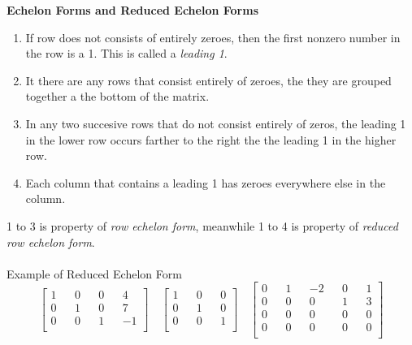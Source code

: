 \documentclass[a4paper, 12pt]{article}
\begin{document}
\textbf{Echelon Forms and Reduced Echelon Forms}
\begin{enumerate}
\item If row does not consists of entirely zeroes, then the first nonzero 
      number in the row is a 1. This is called a \textit{leading 1}.
\item It there are any rows that consist entirely of zeroes, the they are 
      grouped together a the bottom of the matrix.
\item In any two succesive rows that do not consist entirely of zeros, the 
      leading 1 in the lower row occurs farther to the right the the 
      leading 1 in the higher row.
\item Each column that contains a leading 1 has zeroes everywhere else in
      the column.
\end{enumerate}
1 to 3 is property of  \textit{row echelon form}, meanwhile 1 to 4 is 
property of \textit{reduced row echelon form}.
\\
\\
Example of Reduced Echelon Form
$$
\begin{bmatrix}
1 && 0 && 0 && 4 \\
0 && 1 && 0 && 7 \\
0 && 0 && 1 && -1 \\
\end{bmatrix}
\quad
\begin{bmatrix}
1 && 0 && 0 \\
0 && 1 && 0 \\
0 && 0 && 1 \\
\end{bmatrix}
\quad
\begin{bmatrix}
0 && 1 && -2 && 0 && 1 \\
0 && 0 && 0 && 1 && 3  \\
0 && 0 && 0 && 0 && 0  \\
0 && 0 && 0 && 0 && 0  \\
\end{bmatrix}
$$
\end{document}
